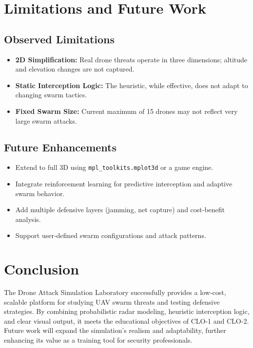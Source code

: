 \documentclass[11pt,a4paper]{article}
\begin{document}
\section{Limitations and Future Work}
\subsection*{Observed Limitations}
\begin{itemize}
    \item \textbf{2D Simplification:} Real drone threats operate in three dimensions; altitude and elevation changes are not captured.
    \item \textbf{Static Interception Logic:} The heuristic, while effective, does not adapt to changing swarm tactics.
    \item \textbf{Fixed Swarm Size:} Current maximum of 15 drones may not reflect very large swarm attacks.
\end{itemize}

\subsection*{Future Enhancements}
\begin{itemize}
    \item Extend to full 3D using \texttt{mpl\_toolkits.mplot3d} or a game engine.
    \item Integrate reinforcement learning for predictive interception and adaptive swarm behavior.
    \item Add multiple defensive layers (jamming, net capture) and cost‑benefit analysis.
    \item Support user‑defined swarm configurations and attack patterns.
\end{itemize}

\section{Conclusion}
The Drone Attack Simulation Laboratory successfully provides a low‑cost, scalable platform for studying UAV swarm threats and testing defensive strategies. By combining probabilistic radar modeling, heuristic interception logic, and clear visual output, it meets the educational objectives of CLO-1 and CLO-2. Future work will expand the simulation’s realism and adaptability, further enhancing its value as a training tool for security professionals.
\end{document}
